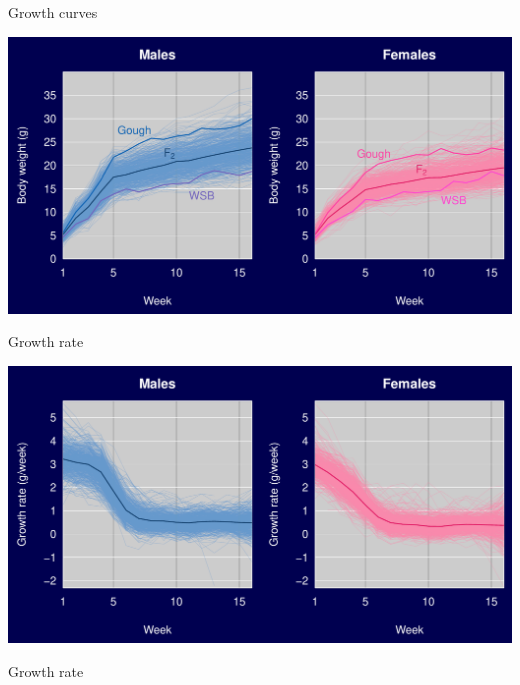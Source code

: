 \documentclass[12pt]{article}
\newcommand{\headsize}{\fontsize{35}{35} \selectfont}
\begin{document}
\newpage

\addtocounter{page}{-1}

\headsize \color{myyellow}
\hfill \begin{minipage}{5.75in}
\centering
Growth curves
\end{minipage}

\vspace{30mm}

\centerline{\includegraphics{Figs/growth3.pdf}}


\newpage

\headsize \color{myyellow}
\hfill \begin{minipage}{5.75in}
\centering
Growth rate
\end{minipage}

\vspace{30mm}

\centerline{\includegraphics{Figs/rate1.pdf}}


\newpage

\addtocounter{page}{-1}

\headsize \color{myyellow}
\hfill \begin{minipage}{5.75in}
\centering
Growth rate
\end{minipage}
\end{document}
